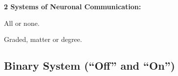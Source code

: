 \begin{coloredlist}
    \item \textbf{2 Systems of Neuronal Communication:}
    \begin{coloredlist}
        \item {}
        \begin{coloredlist}
            \item All or none.
        \end{coloredlist}
        \item {}
        \begin{coloredlist}
            \item Graded, matter or degree.
        \end{coloredlist}
    \end{coloredlist}
\end{coloredlist}

\subsection{Binary System (``Off'' and ``On'')}


